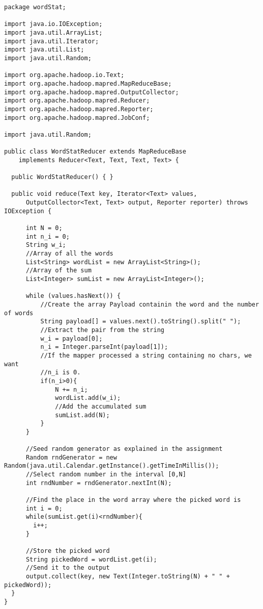 \documentclass[10pt, a4paper]{article}
\begin{document}
\begin{lstlisting}
package wordStat;

import java.io.IOException;
import java.util.ArrayList;
import java.util.Iterator;
import java.util.List;
import java.util.Random;

import org.apache.hadoop.io.Text;
import org.apache.hadoop.mapred.MapReduceBase;
import org.apache.hadoop.mapred.OutputCollector;
import org.apache.hadoop.mapred.Reducer;
import org.apache.hadoop.mapred.Reporter;
import org.apache.hadoop.mapred.JobConf;

import java.util.Random;

public class WordStatReducer extends MapReduceBase
    implements Reducer<Text, Text, Text, Text> {

  public WordStatReducer() { }

  public void reduce(Text key, Iterator<Text> values,
      OutputCollector<Text, Text> output, Reporter reporter) throws IOException {
	  
	  int N = 0;
	  int n_i = 0;
	  String w_i;
	  //Array of all the words
	  List<String> wordList = new ArrayList<String>();
	  //Array of the sum 
	  List<Integer> sumList = new ArrayList<Integer>(); 
	  
	  while (values.hasNext()) {
		  //Create the array Payload containin the word and the number of words
		  String payload[] = values.next().toString().split(" ");
		  //Extract the pair from the string
		  w_i = payload[0];
		  n_i = Integer.parseInt(payload[1]);  
		  //If the mapper processed a string containing no chars, we want
		  //n_i is 0. 
		  if(n_i>0){
			  N += n_i;
			  wordList.add(w_i);
			  //Add the accumulated sum
			  sumList.add(N);
		  }
	  }

	  //Seed random generator as explained in the assignment
	  Random rndGenerator = new Random(java.util.Calendar.getInstance().getTimeInMillis()); 
	  //Select random number in the interval [0,N] 
	  int rndNumber = rndGenerator.nextInt(N);
	  
	  //Find the place in the word array where the picked word is
	  int i = 0;
	  while(sumList.get(i)<rndNumber){
		i++;    
	  }
	  
	  //Store the picked word
	  String pickedWord = wordList.get(i);
	  //Send it to the output
	  output.collect(key, new Text(Integer.toString(N) + " " + pickedWord));  
  }
}  
\end{lstlisting}


% 


\end{document}
